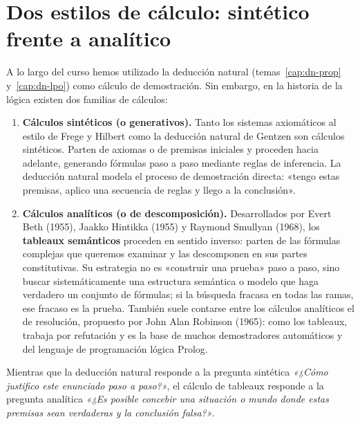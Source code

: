 \section{Dos estilos de cálculo: sintético frente a analítico}

A lo largo del curso hemos utilizado la deducción natural (temas~\ref{cap:dn-prop} y~\ref{cap:dn-lpo}) como cálculo de demostración. Sin embargo, en la historia de la lógica existen dos familias de cálculos:

\begin{enumerate}
    \item \textbf{Cálculos sintéticos (o generativos).}  
    Tanto los sistemas axiomáticos al estilo de Frege y Hilbert como
    la deducción natural de Gentzen son cálculos sintéticos. Parten de
    axiomas o de premisas iniciales y proceden hacia
      adelante, generando fórmulas paso a paso 
    mediante reglas de inferencia. La deducción natural modela
    el proceso de demostración directa: «tengo estas
    premisas, aplico una secuencia de reglas y llego a la conclusión». 
    
    \item \textbf{Cálculos analíticos (o de descomposición).}  
    Desarrollados por Evert Beth (1955), Jaakko Hintikka (1955) y
    Raymond Smullyan (1968), los \textbf{tableaux semánticos} proceden
    en sentido inverso: parten de las fórmulas complejas que queremos
    examinar y las descomponen en sus partes
      constitutivas. Su estrategia no es «construir una prueba» paso
    a paso, sino buscar sistemáticamente una estructura
      semántica o modelo que haga verdadero un conjunto de fórmulas;
    si la búsqueda fracasa en todas las ramas, ese fracaso es la
    prueba. También suele contarse entre los cálculos analíticos el de resolución, propuesto
    por John Alan Robinson (1965): como los tableaux, trabaja por
    refutación y es la base de muchos demostradores automáticos y del
    lenguaje de programación lógica Prolog.
\end{enumerate}

Mientras que la deducción natural responde a la pregunta sintética \emph{«¿Cómo justifico este enunciado paso a paso?»}, el cálculo de tableaux responde a la pregunta analítica \emph{«¿Es posible concebir una situación o mundo donde estas premisas sean verdaderas y la conclusión falsa?»}.

